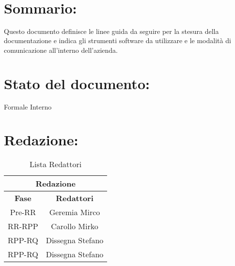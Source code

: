 \newpage
 
\begin{center} %
  \begin{Huge}  
        \textbf{\TITOLODOC}
      \\
  \end{Huge}
\end{center}
 
\section*{\LARGE Sommario:} %
\indent \indent
Questo documento definisce le linee guida da seguire per la stesura della documentazione e indica gli strumenti software da utilizzare e le modalit\`a di comunicazione all'interno dell'azienda.
 
\section*{\LARGE Stato del documento:}
\indent \indent
  Formale Interno
 
\section*{\LARGE Redazione:}
  \begin{table}[!h]
    \begin{center}
      \begin{tabular}
        {|c|c|}
        \hline
        \multicolumn{2}{|c|}{ \textbf{Redazione} } \\
        \hline
        \textbf{Fase} & \textbf{Redattori} \\
        \hline
        {Pre-RR} & Geremia Mirco \\
        \hline
        {RR-RPP} & Carollo Mirko \\
        \hline
        {RPP-RQ} & Dissegna Stefano\\
        \hline
        {RPP-RQ} & Dissegna Stefano \\
        \hline
      \end{tabular}
      \caption{Lista Redattori} %
      \label{tabredazione}
    \end{center}
  \end{table}
  
